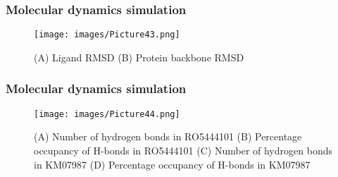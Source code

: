 \documentclass{beamer}
\begin{document}

\begin{frame}
\frametitle{\textbf{Molecular dynamics simulation}}
\begin{figure}
\texttt{[image: images/Picture43.png]}
\caption{(A) Ligand RMSD (B) Protein backbone RMSD}
\end{figure}
\end{frame}

\begin{frame}
\frametitle{\textbf{Molecular dynamics simulation}}
\begin{figure}
\texttt{[image: images/Picture44.png]}
\caption{(A) Number of hydrogen bonds in RO5444101 (B) Percentage occupancy of H-bonds in RO5444101 (C) Number of hydrogen bonds in KM07987 (D) Percentage occupancy of H-bonds in KM07987}
\end{figure}
\end{frame}

%
\end{document}
